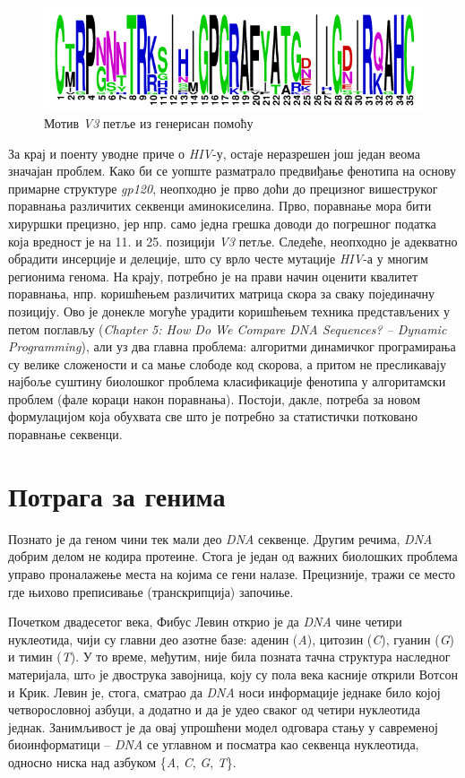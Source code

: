 \documentclass[12pt,oneside]{memoir}
\begin{document}
\begin{CJK}{UTF8}{ipxm}
\begin{figure}[H]
  \centering
  \includegraphics[width=.75\textwidth]{motif.png}
  \caption{Мотив \textit{V3} петље из \cite{compeau2015} генерисан помоћу \cite{weblogo}}
  \label{fig:motif}
\end{figure}

За крај и поенту уводне приче о \textit{HIV}-у, остаје неразрешен још један веома значајан проблем. Како би се уопште разматрало предвиђање фенотипа на основу примарне структуре \textit{gp120}, неопходно је прво доћи до прецизног вишеструког поравнања различитих секвенци аминокиселина. Прво, поравнање мора бити хируршки прецизно, јер нпр. само једна грешка доводи до погрешног податка која вредност је на 11. и 25. позицији \textit{V3} петље. Следеће, неопходно је адекватно обрадити инсерције и делеције, што су врло честе мутације \textit{HIV}-а у многим регионима генома. На крају, потребно је на прави начин оценити квалитет поравнања, нпр. коришћењем различитих матрица скора за сваку појединачну позицију. Ово је донекле могуће урадити коришћењем техника представљених у петом поглављу (\textit{Chapter 5: How Do We Compare DNA Sequences? -- Dynamic Programming}), али уз два главна проблема: алгоритми динамичког програмирања су велике сложености и са мање слободе код скорова, а притом не пресликавају најбоље суштину биолошког проблема класификације фенотипа у алгоритамски проблем (фале кораци након поравнања). Постоји, дакле, потреба за новом формулацијом која обухвата све што је потребно за статистички потковано поравнање секвенци.

\section{Потрага за генима}
Познато је да геном чини тек мали део \textit{DNA} секвенце. Другим речима, \textit{DNA} добрим делом не кодира протеине. Стога је један од важних биолошких проблема управо проналажење места на којима се гени налазе. Прецизније, тражи се место где њихово преписивање (транскрипција) започиње.

Почетком двадесетог века, Фибус Левин открио је да \textit{DNA} чине четири нуклеотида\cite{levene1910}, чији су главни део азотне базе: аденин (\textit{A}), цитозин (\textit{C}), гуанин (\textit{G}) и тимин (\textit{T}). У то време, међутим, није била позната тачна структура наследног материјала, штo је двострука завојница, коју су пола века касније открили Вотсон и Крик\cite{watson1953}. Левин је, стога, сматрао да \textit{DNA} носи информације једнаке било којој четворословној азбуци, а додатно и да је удео сваког од четири нуклеотида једнак. Занимљивост је да овај упрошћени модел одговара стању у савременој биоинформатици -- \textit{DNA} се углавном и посматра као секвенца нуклеотида, односно ниска над азбуком \{\textit{A}, \textit{C}, \textit{G}, \textit{T}\}.


\end{CJK}
\end{document}
